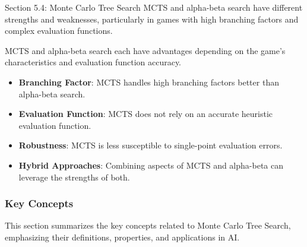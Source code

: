\begin{notes}{Section 5.4: Monte Carlo Tree Search}
    MCTS and alpha-beta search have different strengths and weaknesses, particularly in games with high branching factors and complex evaluation functions.
    
    \begin{highlight}
        MCTS and alpha-beta search each have advantages depending on the game's characteristics and evaluation function accuracy.
        
        \begin{itemize}
            \item \textbf{Branching Factor}: MCTS handles high branching factors better than alpha-beta search.
            \item \textbf{Evaluation Function}: MCTS does not rely on an accurate heuristic evaluation function.
            \item \textbf{Robustness}: MCTS is less susceptible to single-point evaluation errors.
            \item \textbf{Hybrid Approaches}: Combining aspects of MCTS and alpha-beta can leverage the strengths of both.
        \end{itemize}
    \end{highlight}
    
    \subsubsection*{Key Concepts}
    
    \begin{highlight}
        This section summarizes the key concepts related to Monte Carlo Tree Search, emphasizing their definitions, properties, and applications in AI.
        

\end{highlight}
\end{notes}

